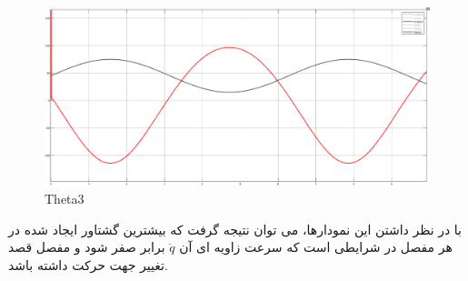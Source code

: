 \begin{figure}[H]
	\centering
	\includegraphics[width=1\linewidth]{../img/8}
	\caption{Theta3}
	\label{fig:8}
\end{figure}
با در نظر داشتن این نمودارها، می توان نتیجه گرفت که بیشترین گشتاور ایجاد شده در هر مفصل در شرایطی است که سرعت  زاویه ای آن $\dot{q}$ برابر صفر شود و مفصل قصد تغییر جهت حرکت داشته باشد.
